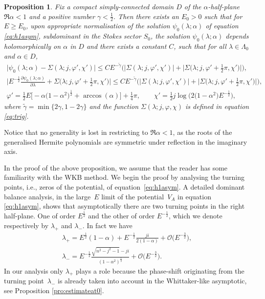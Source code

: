 \documentclass[pdftex]{sigma}
\numberwithin{equation}{section}
\newtheorem{pro}[thm]{Proposition}
\newcommand{\la}{\lambda}
\newcommand{\al}{\alpha}
\begin{document}
\begin{pro}\label{pro:wkbasy}
	Fix a compact simply-connected domain $D$ of the $\al$-half-plane $\Re \al < 1$ and a positive number $\gamma<\frac12$.
	Then there exists an $E_0>0$ such that for $E\geq E_0$, upon appropriate normalisation of the solution $\psi_0(\la;\al)$ of
	equation \eqref{eq:h1asym}, subdominant in the Stokes sector $S_0$, the solution $\psi_0(\la;\alpha)$ depends holomorphically on $\al$ in $D$ and there exists a constant $C$, such that for all $\la \in \Lambda_0$ and $\al\in D$,
		\begin{gather}\nonumber
		\big|\psi_0(\la;\al)-\Sigma(\la;j,\varphi',\chi') \big|\leq C E^{-\tilde{\gamma}} \big(|\Sigma(\la;j,\varphi',\chi')|+
		\big|\Sigma\big(\la;j,\varphi'+\tfrac{1}{2}\pi,\chi'\big)\big|\big),\\ \nonumber
		\big|E^{-\frac12} \frac{\partial \psi_0(\la; \al)}{\partial \la}+\Sigma\big(\la;j,\varphi'+\tfrac{1}{2}\pi,\chi'\big)\big|\leq
		C E^{-\tilde{\gamma}} \big(|\Sigma(\la;j,\varphi',\chi')|+\big|\Sigma\big(\la;j,\varphi'+\tfrac{1}{2}\pi,\chi'\big)\big|\big),\\ \label{eq:asymptransition}
		\varphi'=\tfrac{1}{2}E\big[{-}\al\big(1-\al^2\big)^{\frac12}+\arccos(\al)\big]+\tfrac{1}{4}\pi, \qquad \chi'=\tfrac{1}{2}j\log\big(2\big(1-\al^2\big)E^{-\frac12}\big),
		\end{gather}
where $\tilde{\gamma}=\min\lbrace 2 \gamma, 1-2\gamma \rbrace$ and the function $\Sigma(\la;j,\varphi,\chi)$ is defined in equation \eqref{eq:trig}.
\end{pro}

Notice that no generality is lost in restricting to $\Re \al <1$, as the roots of the generalised Hermite polynomials are symmetric under ref\/lection in the imaginary axis.

In the proof of the above proposition, we assume that the reader has some familiarity with the WKB method. We begin the proof by analysing the turning points, i.e., zeros of the potential, of equation~\eqref{eq:h1asym}. A detailed dominant balance analysis, in the large~$E$ limit of the potential~$V_A$ in equation \eqref{eq:h1asym}, shows that asymptotically there are two turning points in the right half-plane. One of order $E^{\frac12}$ and the other of order $E^{-\frac12}$, which we denote respectively by $\la_+$ and $\la_-$. In fact we have
\begin{gather}\label{eq:la+}
 \la_+=E^{\frac12}(1-\al)+ E^{-\frac{1}{2}}\frac{ji}{2(1-\al)} + \mathcal{O}\big(E^{-\frac{3}{2}}\big),\\ \nonumber
 \la_-=E^{-\frac12}\frac{\sqrt{n^2-j^2-1} -ji}{(1-\al^2)^{\frac12}}+\mathcal{O}\big(E^{-\frac32}\big) .
\end{gather}
In our analysis only $\la_+$ plays a role because the phase-shift originating from the turning point~$\la_-$ is already taken into account in the Whittaker-like asymptotic, see Proposition \ref{pro:estimateat0}.
\end{document}
